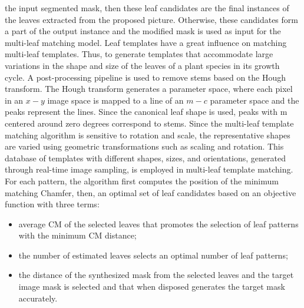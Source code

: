 the input segmented mask, then these leaf candidates are the final instances of the leaves extracted from the proposed picture. Otherwise, these candidates
form a part of the output instance and the modified mask is used as input for the multi-leaf matching model.
Leaf templates have a great influence on matching multi-leaf templates. Thus, to generate templates that accommodate large variations in
the shape and size of the leaves of a plant species in its growth cycle. A post-processing pipeline is used to remove stems based on the Hough
transform. The Hough transform generates a parameter space, where each pixel in an $x-y$ image space is mapped to a line of an $m-c$ parameter space
and the peaks represent the lines. Since the canonical leaf shape is used, peaks with m centered around zero degrees correspond to stems. Since
the multi-leaf template matching algorithm is sensitive to rotation and scale, the representative shapes are varied using geometric transformations
such as scaling and rotation. This database of templates with different shapes, sizes, and orientations, generated through real-time image sampling,
is employed in multi-leaf template matching. For each pattern, the algorithm first computes the position of the minimum matching Chamfer, then, an
optimal set of leaf candidates based on an objective function with three terms: 
\begin{itemize}
    \item average CM of the selected leaves that promotes the selection of leaf patterns with the minimum CM distance;
    \item the number of estimated leaves selects an optimal number of leaf patterns; 
    \item the distance of the synthesized mask from the selected leaves and the target image mask is selected and that when disposed generates the target mask accurately.
\end{itemize}



